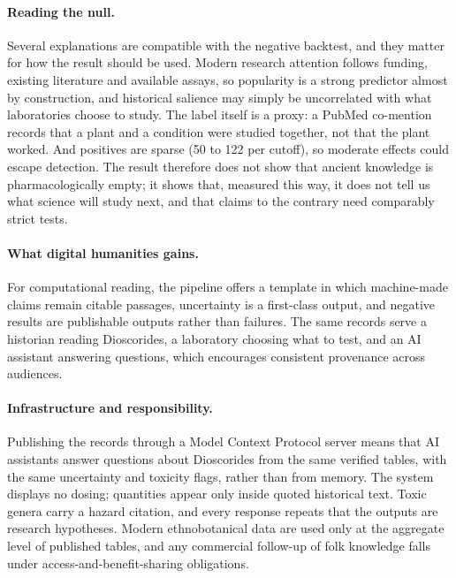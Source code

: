 \documentclass[11pt,a4paper]{article}
\begin{document}
\paragraph{Reading the null.} Several explanations are compatible with the negative backtest, and they matter for how the result should be used. Modern research attention follows funding, existing literature and available assays, so popularity is a strong predictor almost by construction, and historical salience may simply be uncorrelated with what laboratories choose to study. The label itself is a proxy: a PubMed co-mention records that a plant and a condition were studied together, not that the plant worked. And positives are sparse (50 to 122 per cutoff), so moderate effects could escape detection. The result therefore does not show that ancient knowledge is pharmacologically empty; it shows that, measured this way, it does not tell us what science will study next, and that claims to the contrary need comparably strict tests.

\paragraph{What digital humanities gains.} For computational reading, the pipeline offers a template in which machine-made claims remain citable passages, uncertainty is a first-class output, and negative results are publishable outputs rather than failures. The same records serve a historian reading Dioscorides, a laboratory choosing what to test, and an AI assistant answering questions, which encourages consistent provenance across audiences.

\paragraph{Infrastructure and responsibility.} Publishing the records through a Model Context Protocol server means that AI assistants answer questions about Dioscorides from the same verified tables, with the same uncertainty and toxicity flags, rather than from memory. The system displays no dosing; quantities appear only inside quoted historical text. Toxic genera carry a hazard citation, and every response repeats that the outputs are research hypotheses. Modern ethnobotanical data are used only at the aggregate level of published tables, and any commercial follow-up of folk knowledge falls under access-and-benefit-sharing obligations.
\end{document}
